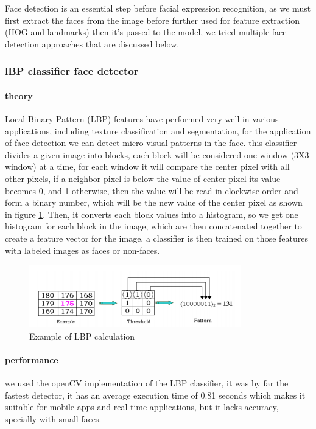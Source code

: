 Face detection is an essential step before facial expression recognition, as we must first extract the faces from the image before further used for feature extraction (HOG and landmarks) then it's passed to the model, we tried multiple face detection approaches that are discussed below.
\subsubsection{lBP classifier face detector}
\paragraph{theory}
Local Binary Pattern (LBP) features have performed very well in various applications, including texture classification and segmentation, for the application of face detection we can detect micro visual patterns in the face.\newline
this classifier divides a given image into blocks, each block will be considered one window (3X3 window) at a time, for each window it will compare the center pixel with all other pixels, if a neighbor pixel is below the value of center pixel its value becomes 0, and 1 otherwise, then the value will be read in clockwise order and form a binary number, which will be the new value of the center pixel as shown in figure \ref{fig:LBP_calculation}.\newline
Then, it converts each block values into a histogram, so we get one histogram for each block in the image, which are then concatenated together to create a feature vector for the image.\newline
a classifier is then trained on those features with labeled images as faces or non-faces.
\begin{figure}
	\centering
	\includegraphics{images/LBP_classifier.png}
	\caption{Example of LBP calculation}
	\label{fig:LBP_calculation}
\end{figure}

\paragraph{performance}
we used the openCV implementation of the LBP classifier, it was by far the fastest detector, it has an average execution time of 0.81 seconds which makes it suitable for mobile apps and real time applications, but it lacks accuracy, specially with small faces.

